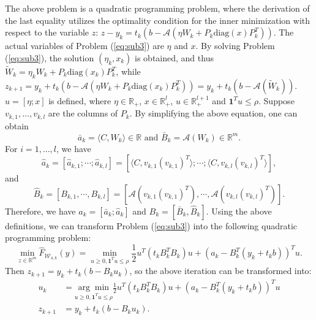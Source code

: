 \documentclass{jcmlatex}
\begin{document}
The above problem is a quadratic programming problem, where the derivation of the last equality utilizes the optimality condition for the inner minimization with respect to the variable \(z\): \(z - y_k = t_k\left(b - \mathcal{A}\left(\eta W_k + P_k \text{diag}(x) P_k^T\right)\right)\). The actual variables of Problem (\ref{eq:sub3}) are \(\eta\) and \(x\). By solving Problem (\ref{eq:sub3}), the solution \((\eta_k, x_k)\) is obtained, and thus \(\tilde{W}_k = \eta_k W_k + P_k \text{diag}(x_k) P_k^T\), while \(z_{k+1} = y_k + t_k\left(b - \mathcal{A}\left(\eta W_k + P_k \text{diag}(x_k) P_k^T\right)\right) = y_k + t_k\left(b - \mathcal{A}(\tilde{W}_k)\right)\). \(u = [\eta; x]\) is defined, where \(\eta \in \mathbb{R}_{+}\), \(x \in \mathbb{R}^{l}_{+}\), \(u \in \mathbb{R}^{l+1}_{+}\) and \(\mathbf{1}^T u \leq \rho\). Suppose \(v_{k,1}, \ldots, v_{k,l}\) are the columns of \(P_k\). By simplifying the above equation, one can obtain
\begin{equation*}
\bar{a}_k = \langle C, W_k \rangle \in \mathbb{R}\text{  and  }  \bar{B}_k = \mathcal{A}(W_k) \in \mathbb{R}^{m}. 
\end{equation*}
For \( i = 1, \ldots, l \), we have
\begin{equation}\label{eq:cons1}
\hat{a}_{k}=[\hat{a}_{k,1};\cdots;\hat{a}_{k,l}]=[\langle C,v_{k,1}(v_{k,1})^{T}\rangle;\cdots;
\langle C,v_{k,l}(v_{k,l})^{T}\rangle],
\end{equation}
and
\begin{equation}\label{eq:cons2}
\hat{B}_{k}=[B_{k,1},\cdots,B_{k,l}]=[\mathcal{A}(v_{k,1}(v_{k,1})^{T}),\cdots,\mathcal{A}(v_{k,l}(v_{k,l})^{T})].
\end{equation}
Therefore, we have \( a_{k} = [\bar{a}_k; \hat{a}_{k}] \) and \( B_{k} = [\bar{B}_k, \hat{B}_{k}] \). Using the above definitions, we can transform Problem (\ref{eq:sub3}) into the following quadratic programming problem:
\begin{equation*}
\underset{z\in\mathbb{R}^{m}}{\min}\hat{F}_{\mathcal{W}_{4,k}}(y)=\underset{u\geq0,\mathbf{1}^T u \leq \rho}{\min}\frac{1}{2}u^{T}(t_{k}B_{k}^{T}B_{k})u+(a_{k}-B_{k}^{T}(y_{k}+t_{k}b))^{T}u.
\end{equation*}
Then \(z_{k+1} = y_{k} + t_{k}(b - B_{k}u_{k})\), so the above iteration can be transformed into:
\begin{equation}\label{eq:sub4}
\begin{aligned}
u_{k}&=\underset{u\geq0,\mathbf{1}^T u \leq \rho}{\arg\min}\frac{1}{2}u^{T}(t_{k}B_{k}^{T}B_{k})u+(a_{k}-B_{k}^{T}(y_{k}+t_{k}b))^{T}u\\ 
z_{k+1}&=y_{k}+t_{k}(b-B_{k}u_{k}).
\end{aligned}
\end{equation}
\end{document}

